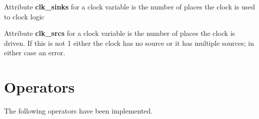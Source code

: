             Attribute {\bf clk\_sinks} for a clock variable is the number of
            places the clock is used to clock logic

            Attribute {\bf clk\_srcs} for a clock variable is the number of
            places the clock is driven. If this is not 1 either the clock has no
            source or it has multiple sources; in either case an error.


           
       
        




    \section{Operators}

        The following operators have been implemented.

